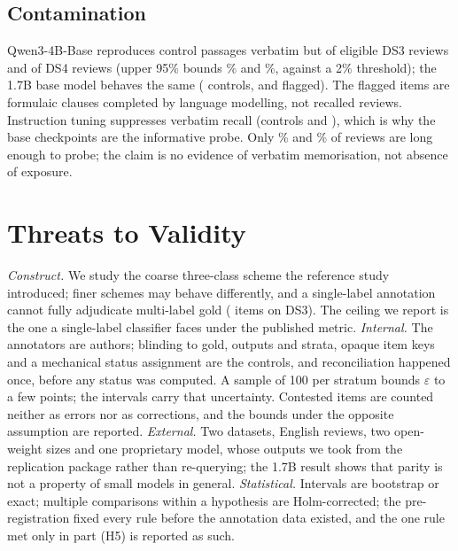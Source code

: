 \documentclass[sigconf,anonymous,review]{acmart}
\newcommand{\eps}{\varepsilon}
\begin{document}
\subsection{Contamination}
Qwen3-4B-Base reproduces \contamControlQfourBase{} control passages verbatim but \contamFlaggedQfourBaseDSthree{} of \contamEligQfourBaseDSthree{} eligible DS3 reviews and \contamFlaggedQfourBaseDSfour{} of \contamEligQfourBaseDSfour{} DS4 reviews (upper 95\% bounds \contamUpperQfourBaseDSthree\% and \contamUpperQfourBaseDSfour\%, against a 2\% threshold); the 1.7B base model behaves the same (\contamControlQseventeenBase{} controls, \contamFlaggedQseventeenBaseDSthree{} and \contamFlaggedQseventeenBaseDSfour{} flagged). The flagged items are formulaic clauses completed by language modelling, not recalled reviews. Instruction tuning suppresses verbatim recall (controls \contamControlQfourInstruct{} and \contamControlQseventeenInstruct), which is why the base checkpoints are the informative probe. Only \eligShareDSthree\% and \eligShareDSfour\% of reviews are long enough to probe; the claim is no evidence of verbatim memorisation, not absence of exposure.

\section{Threats to Validity}
\emph{Construct.} We study the coarse three-class scheme the reference study introduced; finer schemes may behave differently, and a single-label annotation cannot fully adjudicate multi-label gold (\multilabelDSthree{} items on DS3). The ceiling we report is the one a single-label classifier faces under the published metric. \emph{Internal.} The annotators are authors; blinding to gold, outputs and strata, opaque item keys and a mechanical status assignment are the controls, and reconciliation happened once, before any status was computed. A sample of 100 per stratum bounds $\hat\eps$ to a few points; the intervals carry that uncertainty. Contested items are counted neither as errors nor as corrections, and the bounds under the opposite assumption are reported. \emph{External.} Two datasets, English reviews, two open-weight sizes and one proprietary model, whose outputs we took from the replication package rather than re-querying; the 1.7B result shows that parity is not a property of small models in general. \emph{Statistical.} Intervals are bootstrap or exact; multiple comparisons within a hypothesis are Holm-corrected; the pre-registration fixed every rule before the annotation data existed, and the one rule met only in part (H5) is reported as such.
\end{document}
